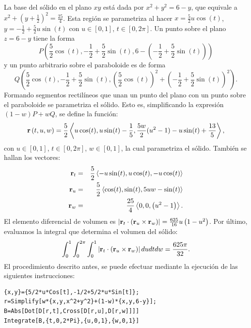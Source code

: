 La base del sólido en el plano $xy$ está dada por
$x^2+y^2=6-y$, que equivale a $x^2+\left( y+\frac{1}{2}\right)^2=\frac{25}{4}$.
Esta región se parametriza al hacer $x=\frac{5}{2}u\cos(t)$, $y=-\frac{1}{2}+\frac{5}{2}u\sin(t)$
con $u\in [0,1]$, $t\in [0,2\pi]$. Un punto sobre el plano $z=6-y$ tiene la forma
\[P\left(\frac{5}{2}\cos(t),-\frac{1}{2}+\frac{5}{2}\sin(t),6-(-\frac{1}{2}+\frac{5}{2}\sin(t))\right)\]
y un punto arbitrario sobre el paraboloide es de  forma
\[Q\left(\frac{5}{2}\cos(t),-\frac{1}{2}+\frac{5}{2}\sin(t),(\frac{5}{2}\cos(t))^2+(-\frac{1}{2}+\frac{5}{2}\sin(t))^2\right).\]
Formando segmentos rectilíneos que unan un punto del plano con un punto sobre el paraboloide se parametriza el sólido. Esto es, simplificando la expresión $(1-w)P+wQ$, se define la función:
\[{\bf r}\left(t,u,w\right)=\frac{5}{2} \left\langle u \cos (t),u\sin(t)-\frac{1}{5},\frac{5w}{2}(u^2-1)-u\sin(t)+\frac{13}{5} \right\rangle,\]
con $u\in [0,1]$, $t\in [0,2\pi]$, $w\in [0,1]$,
la cual parametriza el sólido. También se hallan los vectores:
\begin{eqnarray*}
{\bf r}_{t} &=& \frac{5}{2}\left\langle - u \sin (t), u \cos (t),- u \cos (t) \right\rangle \\
{\bf r}_{u} &=& \frac{5}{2}\left\langle \cos (t), \sin (t),5 u w-\sin (t)\right\rangle \\
{\bf r}_{w} &=& \frac{25}{4}\left\langle 0,0, \left(u^2-1\right) \right\rangle.
\end{eqnarray*}
El elemento diferencial de volumen es
$\left|{\bf r}_{t}\cdot\left({\bf r}_{u}\times {\bf r}_{w}\right)\right| =\frac{625}{16} u \left(1-u^2\right)$.
Por último, evaluamos la integral que determina el volumen del sólido:
\[ \int_{0}^{1}\int_{0}^{2\pi}\int_{0}^{1} \left|{\bf r}_{t}\cdot\left({\bf r}_{u}\times {\bf r}_{w}\right)\right|dudtdw=\frac{625\pi}{32}.\]
El procedimiento descrito antes, se puede efectuar mediante la ejecución de las siguientes instrucciones:

\begin{tcolorbox}[title=\bf Instrucción en \verb"Mathematica"]\begin{Verbatim}[formatcom=\letraverbatim]
{x,y}={5/2*u*Cos[t],-1/2+5/2*u*Sin[t]};
r=Simplify[w*{x,y,x^2+y^2}+(1-w)*{x,y,6-y}];
B=Abs[Dot[D[r,t],Cross[D[r,u],D[r,w]]]]
Integrate[B,{t,0,2*Pi},{u,0,1},{w,0,1}]
\end{Verbatim}
\end{tcolorbox}

